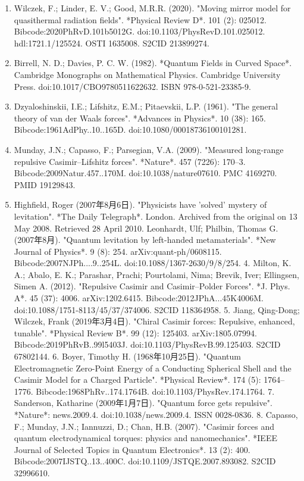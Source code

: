 \begin{enumerate}
\item Wilczek, F.; Linder, E. V.; Good, M.R.R. (2020). "Moving mirror model for quasithermal radiation fields". *Physical Review D*. 101 (2): 025012. Bibcode:2020PhRvD.101b5012G. doi:10.1103/PhysRevD.101.025012. hdl:1721.1/125524. OSTI 1635008. S2CID 213899274.
\item Birrell, N. D.; Davies, P. C. W. (1982). *Quantum Fields in Curved Space*. Cambridge Monographs on Mathematical Physics. Cambridge University Press. doi:10.1017/CBO9780511622632. ISBN 978-0-521-23385-9.
\item Dzyaloshinskii, I.E.; Lifshitz, E.M.; Pitaevskii, L.P. (1961). "The general theory of van der Waals forces". *Advances in Physics*. 10 (38): 165. Bibcode:1961AdPhy..10..165D. doi:10.1080/00018736100101281.
\item Munday, J.N.; Capasso, F.; Parsegian, V.A. (2009). "Measured long-range repulsive Casimir–Lifshitz forces". *Nature*. 457 (7226): 170–3. Bibcode:2009Natur.457..170M. doi:10.1038/nature07610. PMC 4169270. PMID 19129843.
\item Highfield, Roger (2007年8月6日). "Physicists have 'solved' mystery of levitation". *The Daily Telegraph*. London. Archived from the original on 13 May 2008. Retrieved 28 April 2010.
Leonhardt, Ulf; Philbin, Thomas G. (2007年8月). "Quantum levitation by left-handed metamaterials". *New Journal of Physics*. 9 (8): 254. arXiv:quant-ph/0608115. Bibcode:2007NJPh....9..254L. doi:10.1088/1367-2630/9/8/254.
4. Milton, K. A.; Abalo, E. K.; Parashar, Prachi; Pourtolami, Nima; Brevik, Iver; Ellingsen, Simen A. (2012). "Repulsive Casimir and Casimir–Polder Forces". *J. Phys. A*. 45 (37): 4006. arXiv:1202.6415. Bibcode:2012JPhA...45K4006M. doi:10.1088/1751-8113/45/37/374006. S2CID 118364958.
5. Jiang, Qing-Dong; Wilczek, Frank (2019年3月4日). "Chiral Casimir forces: Repulsive, enhanced, tunable". *Physical Review B*. 99 (12): 125403. arXiv:1805.07994. Bibcode:2019PhRvB..99l5403J. doi:10.1103/PhysRevB.99.125403. S2CID 67802144.
6. Boyer, Timothy H. (1968年10月25日). "Quantum Electromagnetic Zero-Point Energy of a Conducting Spherical Shell and the Casimir Model for a Charged Particle". *Physical Review*. 174 (5): 1764–1776. Bibcode:1968PhRv..174.1764B. doi:10.1103/PhysRev.174.1764.
7. Sanderson, Katharine (2009年1月7日). "Quantum force gets repulsive". *Nature*: news.2009.4. doi:10.1038/news.2009.4. ISSN 0028-0836.
8. Capasso, F.; Munday, J.N.; Iannuzzi, D.; Chan, H.B. (2007). "Casimir forces and quantum electrodynamical torques: physics and nanomechanics". *IEEE Journal of Selected Topics in Quantum Electronics*. 13 (2): 400. Bibcode:2007IJSTQ..13..400C. doi:10.1109/JSTQE.2007.893082. S2CID 32996610.

\end{enumerate}

